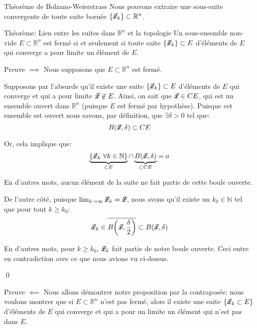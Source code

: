 \documentclass[a4paper]{article}
\begin{document}
\begin{parag}{Théorème de Bolzano-Weierstrass}
    Nous pouvons extraire une sous-suite convergente de toute suite bornée $\left\{\bvec{x}_k\right\} \subset \mathbb{R}^n$.
\end{parag}

\begin{parag}{Théorème: Lien entre les suites dans $\mathbb{R}^n$ et la topologie}
    Un sous-ensemble non-vide $E \subset \mathbb{R}^n$ est fermé si et seulement si toute suite $\left\{\bvec{x}_k\right\} \subset E$ d'éléments de $E$ qui converge a pour limite un élément de $E$.

    \demonstrationaconnaitre

    \begin{subparag}{Preuve $\implies$}
        Nous supposons que $E \subset \mathbb{R}^n$ est fermé.

        Supposons par l'absurde qu'il existe une suite $\left\{\bvec{x}_k\right\} \subset E$ d'éléments de $E$ qui converge et qui a pour limite $\bm{\protect\vec{x}} \not\in E$. Ainsi, on sait que $\bm{\protect\vec{x}} \in CE$, qui est un ensemble ouvert dans $\mathbb{R}^n$ (puisque $E$ est fermé par hypothèse). Puisque cet ensemble est ouvert nous savons, par définition, que $\exists \delta > 0$ tel que: 
        \[B\left(\bvec{x}, \delta\right) \subset CE\]
      
        Or, cela implique que: 
        \[\underbrace{\left\{\bvec{x}_k\ \forall k \in \mathbb{N}\right\}}_{\subset E} \cap \underbrace{B\left(\bvec{x}, \delta\right)}_{\subset CE} = \o\]

        En d'autres mots, aucun élément de la suite ne fait partie de cette boule ouverte.

        De l'autre côté, puisque $\lim_{k \to \infty} \bm{\protect\vec{x}}_k = \bm{\protect\vec{x}}$, nous avons qu'il existe un $k_0 \in \mathbb{N}$ tel que pour tout $k \geq k_0$: 
        \[\bvec{x}_k \in \bar{B\left(\bvec{x}, \frac{\delta}{2}\right)} \subset B\left(\bvec{x}, \delta\right)\]

        En d'autres mots, pour $k \geq k_0$, $\bm{\protect\vec{x}}_k$ fait partie de notre boule ouverte. Ceci entre en contradiction avec ce que nous avions vu ci-dessus.

        \qed
    \end{subparag}
    
    \begin{subparag}{Preuve $\impliedby$}
        Nous allons démontrer notre proposition par la contraposée: nous voulons montrer que si $E \subset \mathbb{R}^n$ n'est pas fermé, alors il existe une suite $\left\{\bvec{x}_k \subset E\right\}$ d'éléments de $E$ qui converge et qui a pour un limite un élément qui n'est pas dans $E$.


\end{subparag}
\end{parag}
\end{document}
